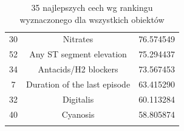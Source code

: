 \documentclass{article}
\begin{document}
\begin{center}
\begin{longtable}{ |c|c|c| }
			30 & Nitrates & 76.574549 \\
			52 & Any ST segment elevation & 75.294437 \\
			34 & Antacids/H2 blockers & 73.567453 \\
			7 & Duration of the last episode & 63.415290 \\
			32 & Digitalis & 60.113284 \\
			40 & Cyanosis & 58.805874 \\
		\hline
		\caption{35 najlepszych cech wg rankingu wyznaczonego dla wszystkich obiektów}
		\label{tab:feature-ranking-table}
	\end{longtable}
\end{center}



\end{document}
